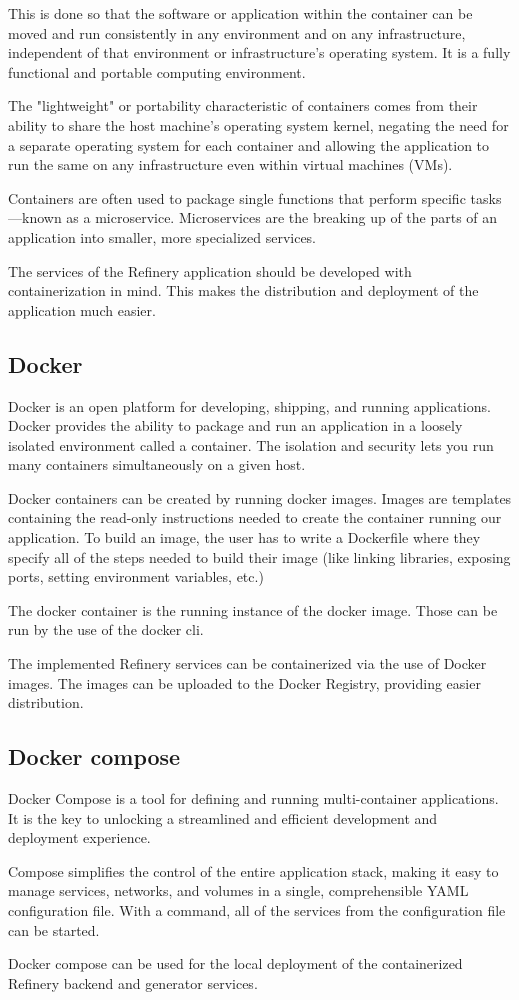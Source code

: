 	This is done so that the software or application within the container can be moved and run consistently 
	in any environment and on any infrastructure, independent of that environment or infrastructure’s 
	operating system. It is a fully functional 
	and portable computing environment.

	The "lightweight" or portability characteristic of containers comes from their ability to share 
	the host machine’s operating system kernel, negating the need for a separate operating system for 
	each container and allowing the application to run the same on any infrastructure 
	even within virtual machines (VMs).

	Containers are often used to package single functions that perform specific tasks—known as a microservice. 
	Microservices are the breaking up of the parts of an application into smaller, more specialized services. 

	The services of the Refinery application should be developed with containerization in mind. This makes 
	the distribution and deployment of the application much easier.

	\subsection{Docker}
		Docker \cite{docker} is an open platform for developing, shipping, and running applications. 
		Docker provides the ability to package and run an application in a loosely isolated environment 
		called a container. The isolation and security lets you run many containers simultaneously 
		on a given host.

		Docker containers can be created by running docker images. Images are templates 
		containing the read-only instructions needed 
		to create the container running our application. To build an image, the user has to write a Dockerfile
		where they specify all of the steps needed to build their image (like linking libraries, exposing ports, 
		setting environment variables, etc.)

		The docker container is the running instance of the docker image. Those can be run by the use of the docker cli.

		The implemented Refinery services can be containerized via the use of Docker images. The images can be uploaded to the 
		Docker Registry, providing easier distribution.


	\subsection{Docker compose}
		Docker Compose \cite{dockercompose} is a tool for defining and running multi-container applications. 
		It is the key to unlocking a streamlined and efficient development and deployment experience.

		Compose simplifies the control of the entire application stack, making it easy to manage services, 
		networks, and volumes in a single, comprehensible YAML configuration file. 
		With a command, all of the services from the configuration file can be started.

		Docker compose can be used for the local deployment of the containerized Refinery backend and generator services.

